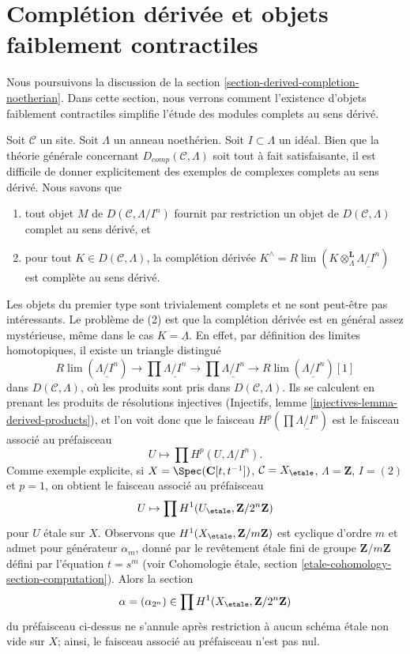 \section{Complétion dérivée et objets faiblement contractiles}
\label{section-derived-completion-proetale}

\noindent
Nous poursuivons la discussion de la
section \ref{section-derived-completion-noetherian}.
Dans cette section, nous verrons comment l'existence
d'objets faiblement contractiles simplifie l'étude
des modules complets au sens dérivé.

\medskip\noindent
Soit $\mathcal{C}$ un site. Soit $\Lambda$ un anneau noethérien.
Soit $I \subset \Lambda$ un idéal. Bien que la théorie générale
concernant $D_{comp}(\mathcal{C}, \Lambda)$ soit tout à fait satisfaisante,
il est difficile de donner explicitement des exemples de complexes complets au sens dérivé.
Nous savons que
\begin{enumerate}
\item tout objet $M$ de $D(\mathcal{C}, \Lambda/I^n)$ fournit par restriction un objet
de $D(\mathcal{C}, \Lambda)$ complet au sens dérivé, et
\item pour tout $K \in D(\mathcal{C}, \Lambda)$, la complétion dérivée
$K^\wedge = R\lim (K \otimes_\Lambda^\mathbf{L} \underline{\Lambda/I^n})$
est complète au sens dérivé.
\end{enumerate}
Les objets du premier type sont trivialement complets et ne sont peut-être pas
intéressants. Le problème de (2) est que la complétion dérivée
est en général assez mystérieuse, même dans le cas $K = \underline{\Lambda}$.
En effet, par définition des limites homotopiques, il
existe un triangle distingué
$$
R\lim(\underline{\Lambda/I^n}) \to
\prod \underline{\Lambda/I^n} \to
\prod \underline{\Lambda/I^n} \to
R\lim(\underline{\Lambda/I^n})[1]
$$
dans $D(\mathcal{C}, \Lambda)$, où les produits sont pris dans
$D(\mathcal{C}, \Lambda)$. Ils se calculent en prenant les produits
de résolutions injectives
(Injectifs, lemme \ref{injectives-lemma-derived-products}),
et l'on voit donc que le faisceau $H^p(\prod \underline{\Lambda/I^n})$
est le faisceau associé au préfaisceau
$$
U \longmapsto \prod H^p(U, \Lambda/I^n).
$$
Comme exemple explicite, si $X = \Spec(\mathbf{C}[t, t^{-1}])$,
$\mathcal{C} = X_\etale$, $\Lambda = \mathbf{Z}$, $I = (2)$ et
$p = 1$, on obtient le faisceau associé au préfaisceau
$$
U \mapsto \prod H^1(U_\etale, \mathbf{Z}/2^n\mathbf{Z})
$$
pour $U$ \'etale sur $X$. Observons que $H^1(X_\etale, \mathbf{Z}/m\mathbf{Z})$
est cyclique d'ordre $m$ et admet pour générateur $\alpha_m$, donné par le revêtement \'etale fini
de groupe $\mathbf{Z}/m\mathbf{Z}$ défini par l'équation $t = s^m$
(voir Cohomologie \'etale, section \ref{etale-cohomology-section-computation}).
Alors la section
$$
\alpha = (\alpha_{2^n}) \in \prod H^1(X_\etale, \mathbf{Z}/2^n\mathbf{Z})
$$
du préfaisceau ci-dessus ne s'annule après restriction à aucun schéma \'etale
non vide sur $X$; ainsi, le faisceau associé au préfaisceau n'est pas nul.

